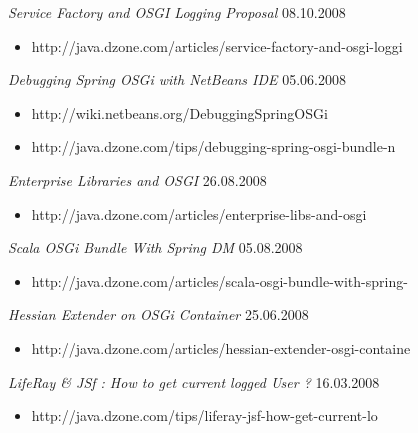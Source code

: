 \documentclass{res}
\begin{document}
\begin{resume}
{{\sl Service Factory and OSGI Logging Proposal}  \hfill   08.10.2008	\\
\vspace{-5mm}  \begin{itemize}
\item[]  \scriptsize http://java.dzone.com/articles/service-factory-and-osgi-loggi
\end{itemize}
\vspace{-2mm}

{\sl Debugging Spring OSGi with NetBeans IDE}  \hfill   05.06.2008	\\
\vspace{-5mm}  \begin{itemize}
\item[]  \scriptsize http://wiki.netbeans.org/DebuggingSpringOSGi
\vspace{-2mm}
\item[]  \scriptsize http://java.dzone.com/tips/debugging-spring-osgi-bundle-n
\end{itemize}
\vspace{-2mm}

{\sl Enterprise Libraries and OSGI}  \hfill   26.08.2008	\\
\vspace{-5mm}  \begin{itemize}
\item[]  \scriptsize http://java.dzone.com/articles/enterprise-libs-and-osgi
\end{itemize}
\vspace{-2mm}

{\sl Scala OSGi Bundle With Spring DM}  \hfill   05.08.2008	\\
\vspace{-5mm}  \begin{itemize}
\item[]  \scriptsize http://java.dzone.com/articles/scala-osgi-bundle-with-spring-
\end{itemize}
\vspace{-2mm}

{\sl Hessian Extender on OSGi Container}  \hfill    25.06.2008	\\
\vspace{-5mm}  \begin{itemize}
\item[]  \scriptsize http://java.dzone.com/articles/hessian-extender-osgi-containe
\end{itemize}
\vspace{-2mm}

{\sl LifeRay \& JSf : How to get current logged User ?}  \hfill    16.03.2008	\\
\vspace{-5mm}  \begin{itemize}
\item[]  \scriptsize http://java.dzone.com/tips/liferay-jsf-how-get-current-lo
\end{itemize}
\vspace{-2mm}


}
\end{resume}
\end{document}
